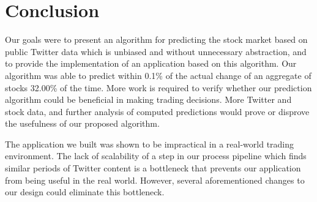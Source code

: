 \documentclass[twocolumn]{article}
\begin{document}
\section{Conclusion}
Our goals were to present an algorithm for predicting the stock market based on public Twitter data which is unbiased and without unnecessary abstraction, and to provide the implementation of an application based on this algorithm. Our algorithm was able to predict within 0.1\% of the actual change of an aggregate of stocks 32.00\% of the time. More work is required to verify whether our prediction algorithm could be beneficial in making trading decisions. More Twitter and stock data, and further analysis of computed predictions would prove or disprove the usefulness of our proposed algorithm.

The application we built was shown to be impractical in a real-world trading environment. The lack of scalability of a step in our process pipeline which finds similar periods of Twitter content is a bottleneck that prevents our application from being useful in the real world. However, several aforementioned changes to our design could eliminate this bottleneck.



\end{document}
